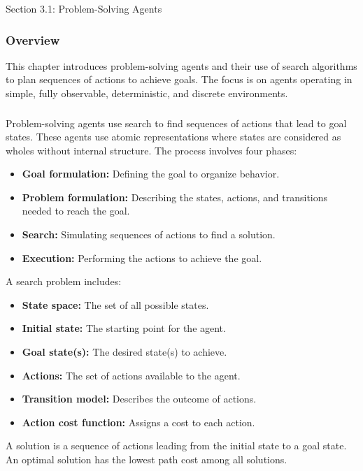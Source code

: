 \begin{notes}{Section 3.1: Problem-Solving Agents}
    \subsubsection*{Overview}

    This chapter introduces problem-solving agents and their use of search algorithms to plan sequences of actions to achieve goals. The focus is on agents operating in simple, fully observable, 
    deterministic, and discrete environments.

    \subsubsection*{}

    \begin{highlight}
        Problem-solving agents use search to find sequences of actions that lead to goal states. These agents use atomic representations where states are considered as wholes without internal structure. 
        The process involves four phases:
        \begin{itemize}
            \item \textbf{Goal formulation:} Defining the goal to organize behavior.
            \item \textbf{Problem formulation:} Describing the states, actions, and transitions needed to reach the goal.
            \item \textbf{Search:} Simulating sequences of actions to find a solution.
            \item \textbf{Execution:} Performing the actions to achieve the goal.
        \end{itemize}
    \end{highlight}

    \begin{highlight}
        A search problem includes:
        \begin{itemize}
            \item \textbf{State space:} The set of all possible states.
            \item \textbf{Initial state:} The starting point for the agent.
            \item \textbf{Goal state(s):} The desired state(s) to achieve.
            \item \textbf{Actions:} The set of actions available to the agent.
            \item \textbf{Transition model:} Describes the outcome of actions.
            \item \textbf{Action cost function:} Assigns a cost to each action.
        \end{itemize}
        A solution is a sequence of actions leading from the initial state to a goal state. An optimal solution has the lowest path cost among all solutions.
    \end{highlight}


\end{notes}
